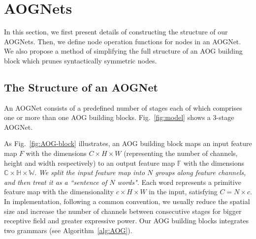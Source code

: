 \documentclass[10pt,twocolumn,letterpaper]{article}
\begin{document}
\section{AOGNets} \label{sec:AOGNets}
In this section, we first present details of constructing the structure of our AOGNets. Then, we define node operation functions for nodes in an AOGNet. We also propose a method of simplifying the full structure of an AOG building block which prunes syntactically symmetric nodes.  

\subsection{The Structure of an AOGNet} \label{sec:structure}
An AOGNet consists of a predefined number of stages each of which comprises one or more than one AOG building blocks.  Fig.~\ref{fig:model} shows a 3-stage AOGNet. 

As Fig.~\ref{fig:AOG-block} illustrates, an AOG building block maps an input feature map $F$ with the dimensions  $C\times H\times W$ (representing the number of channels, height and width respectively) to an output feature map $\mathbb{F}$ with the dimensions $\mathbb{C}\times \mathbb{H}\times \mathbb{W}$. \emph{We split the input feature map into $N$ groups along feature channels, and then treat it as a ``sentence of $N$ words".} Each word represents a primitive feature map with the dimensionality $c\times H \times W$ in the input, satisfying $C=N\times c$. In implementation, following a common  convention, we usually reduce the spatial size and increase the number of channels between consecutive stages for bigger receptive field and greater expressive power. %
Our AOG building blocks integrates two grammars (see Algorithm~\ref{alg:AOG}). 
\end{document}
